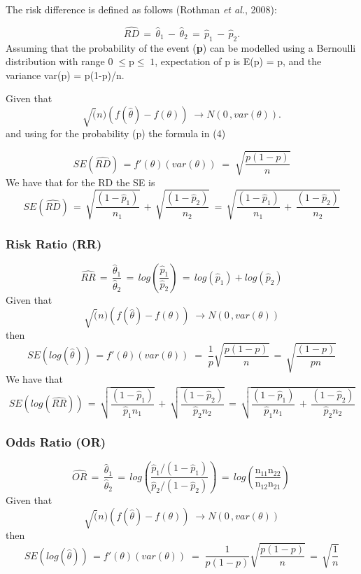 \documentclass[
]{article}
\begin{document}
The risk difference is defined as follows (Rothman \emph{et al.}, 2008):

\[\widehat{RD} \,=\, \hat \theta_{1}\,-\,\hat \theta_{2} \,=\, \hat p_{1}\,-\,\hat p_{2}.\]
Assuming that the probability of the event (\textbf{p}) can be modelled
using a Bernoulli distribution with range \(0\;\leq \text{p} \leq\;1\),
expectation of p is E(p) = p, and the variance var(p) = p(1-p)/n.~

Given that
\[\sqrt(n)\left(f(\hat\theta)-f(\theta)\right)\; \rightarrow N(0\,, var(\theta)).\]
and using for the probability (p) the formula in (4)

\[SE(\widehat{RD})\,=f'(\theta)(var(\theta))\;=\; \sqrt{\frac{p(1-p)}{n}}\]
We have that for the RD the SE is\\
\[SE(\widehat{RD})\,=\, \sqrt{\frac{(1-\hat p_{1})}{n_{1}}}\,+\,\sqrt{\frac{(1-\hat p_{2})}{n_{2}}}\,=\,\sqrt{\frac{(1-\hat p_{1})}{n_{1}}\,+\,\frac{(1-\hat p_{2})}{n_{2}}}\]

\hypertarget{risk-ratio-rr}{%
\subsubsection{Risk Ratio (RR)}\label{risk-ratio-rr}}

\[\widehat{RR} \,=\, \frac{\hat \theta_{1}}{\hat \theta_{2}} \,=\, log\left(\frac{\hat p_{1}}{\hat p_{2}}\right)\,=\,log(\hat p_{1}) + log(\hat p_{2})\]
Given that
\[\sqrt(n)\left(f(\hat\theta)-f(\theta)\right)\; \rightarrow N(0\,, var(\theta))\]
then
\[SE(log(\hat{\theta}))\,=f'(\theta)(var(\theta))\;=\;\frac{1}{p}\sqrt{\frac{p(1-p)}{n}}\,=\,\sqrt{\frac{(1-p)}{pn}}\]
We have that
\[SE(log(\widehat{RR}))\,=\, \sqrt{\frac{(1-\hat p_{1})}{\hat p_{1}n_{1}}}\,+\,\sqrt{\frac{(1-\hat p_{2})}{\hat p_{2}n_{2}}}\,=\,\sqrt{\frac{(1-\hat p_{1})}{\hat p_{1}n_{1}}\,+\,\frac{(1-\hat p_{2})}{\hat p_{2}n_{2}}}\]

\hypertarget{odds-ratio-or}{%
\subsubsection{Odds Ratio (OR)}\label{odds-ratio-or}}

\[\widehat{OR} \,=\, \frac{\hat \theta_{1}}{\hat \theta_{2}} \,=\, log\left(\frac{\hat p_{1}/(1-\hat p_{1})}{\hat p_{2}/(1-\hat p_{2})}\right)\,=\,log\left(\frac{\text{n}_{11}\text{n}_{22}}{\text{n}_{12}\text{n}_{21}}\right)\,\]
Given that
\[\sqrt(n)\left(f(\hat\theta)-f(\theta)\right)\; \rightarrow N(0\,, var(\theta))\]
then
\[SE(log(\hat{\theta}))\,=f'(\theta)(var(\theta))\;=\;\frac{1}{p(1-p)}\sqrt{\frac{p(1-p)}{n}}\,=\,\sqrt{\frac{1}{n}}\]
\end{document}
